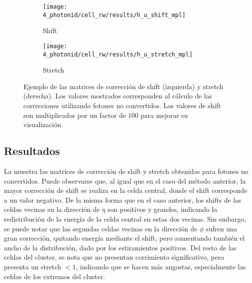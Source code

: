\begin{figure}[ht!]
    \centering
    \begin{subfigure}[h]{0.49\linewidth}
        \centering
        \texttt{[image: 4\_photonid/cell\_rw/results/h\_u\_shift\_mpl]}
        \caption{Shift}
    \end{subfigure}
    \hfill
    \begin{subfigure}[h]{0.49\linewidth}
        \centering
        \texttt{[image: 4\_photonid/cell\_rw/results/h\_u\_stretch\_mpl]}
        \caption{Stretch}
    \end{subfigure}
    \caption{Ejemplo de las matrices de correcci\'on de shift (izquierda) y stretch (derecha). Los valores mostrados corresponden al c\'alculo de las correcciones utilizando fotones no convertidos. Los valores de shift son multiplicados por un factor de 100 para mejorar su visualizaci\'on.}
    \label{fig:ss_corrections:cell_rw:calculation:new:reweights}
\end{figure}









\subsection{Resultados}
\label{subsec:ss_corrections:cell_rw:results}

La \Fig{\ref{fig:ss_corrections:cell_rw:calculation:new:reweights}} muestra las matrices de correcci\'on de shift y stretch obtenidas para fotones no convertidos. Puede observarse que, al igual que en el caso del m\'etodo anterior, la mayor corrección de shift se realiza en la celda central, donde el shift corresponde a un valor negativo. De la misma forma que en el caso anterior, los shifts de las celdas vecinas en la direcci\'on de \(\eta\) son positivos y grandes, indicando la redistribuci\'on de la energ\'ia de la celda central en estas dos vecinas.
Sin embargo, se puede notar que las segundas celdas vecinas en la direcci\'on de \(\phi\) sufren una gran correcci\'on, quitando energ\'ia mediante el shift, pero aumentando tambi\'en el ancho de la distribuci\'on, dado por los estiramientos positivos. Del resto de las celdas del cluster, se nota que no presentan corrimiento significativo, pero presenta un stretch \(<1\), indicando que se hacen m\'as angostas, especialmente las celdas de los extremos del cluster.

